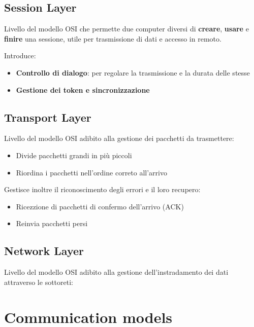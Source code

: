 \subsection{Session Layer}

Livello del modello OSI che permette due computer diversi di \textbf{creare}, \textbf{usare}
e \textbf{finire} una sessione, utile per trasmissione di dati e accesso in remoto.

Introduce:
\begin{itemize}
  \item \textbf{Controllo di dialogo}: per regolare la trasmissione e la durata delle stesse
  \item \textbf{Gestione dei token e sincronizzazione}
\end{itemize}

\subsection{Transport Layer}
Livello del modello OSI adibito alla gestione dei pacchetti da trasmettere:
\begin{itemize}
  \item Divide pacchetti grandi in più piccoli
  \item Riordina i pacchetti nell'ordine correto all'arrivo
\end{itemize}

Gestisce inoltre il riconoscimento degli errori e il loro recupero:
\begin{itemize}
  \item Ricezzione di pacchetti di confermo dell'arrivo (ACK)
  \item Reinvia pacchetti persi
\end{itemize}


\subsection{Network Layer}
Livello del modello OSI adibito alla gestione dell'instradamento dei dati attraverso le sottoreti:














\section{Communication models}
